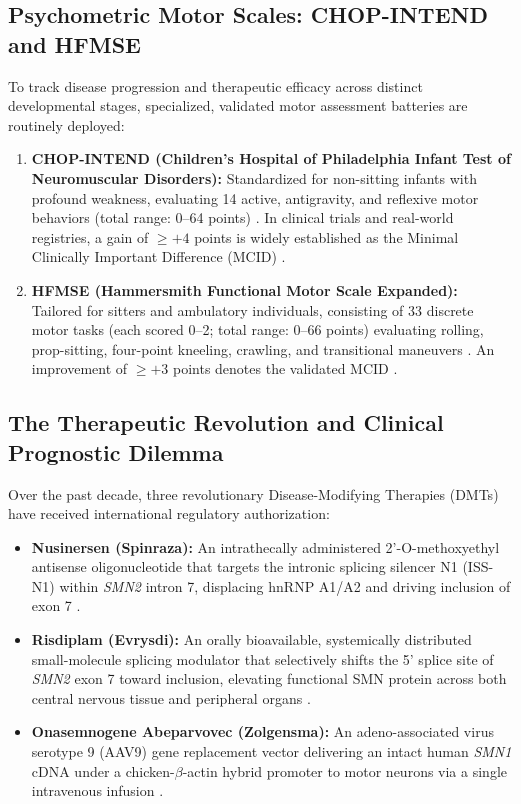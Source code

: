\documentclass[journal]{IEEEtran}
\begin{document}
\subsection{Psychometric Motor Scales: CHOP-INTEND and HFMSE}
To track disease progression and therapeutic efficacy across distinct developmental stages, specialized, validated motor assessment batteries are routinely deployed:
\begin{enumerate}
    \item \textbf{CHOP-INTEND (Children's Hospital of Philadelphia Infant Test of Neuromuscular Disorders):} Standardized for non-sitting infants with profound weakness, evaluating 14 active, antigravity, and reflexive motor behaviors (total range: 0--64 points) \cite{glanzman2010chop}. In clinical trials and real-world registries, a gain of $\ge +4$ points is widely established as the Minimal Clinically Important Difference (MCID) \cite{finkel2021endear,connolly2016clinical}.
    \item \textbf{HFMSE (Hammersmith Functional Motor Scale Expanded):} Tailored for sitters and ambulatory individuals, consisting of 33 discrete motor tasks (each scored 0--2; total range: 0--66 points) evaluating rolling, prop-sitting, four-point kneeling, crawling, and transitional maneuvers \cite{ohagen2007expanded}. An improvement of $\ge +3$ points denotes the validated MCID \cite{montes2019minimal}.
\end{enumerate}

\subsection{The Therapeutic Revolution and Clinical Prognostic Dilemma}
Over the past decade, three revolutionary Disease-Modifying Therapies (DMTs) have received international regulatory authorization:
\begin{itemize}
    \item \textbf{Nusinersen (Spinraza):} An intrathecally administered 2'-O-methoxyethyl antisense oligonucleotide that targets the intronic splicing silencer N1 (ISS-N1) within \textit{SMN2} intron 7, displacing hnRNP A1/A2 and driving inclusion of exon 7 \cite{hua2007enhancement,mercuri2018nusinersen}.
    \item \textbf{Risdiplam (Evrysdi):} An orally bioavailable, systemically distributed small-molecule splicing modulator that selectively shifts the 5' splice site of \textit{SMN2} exon 7 toward inclusion, elevating functional SMN protein across both central nervous tissue and peripheral organs \cite{ratni2018discovery,mercuri2021risdiplam,chiriboga2023sunfish}.
    \item \textbf{Onasemnogene Abeparvovec (Zolgensma):} An adeno-associated virus serotype 9 (AAV9) gene replacement vector delivering an intact human \textit{SMN1} cDNA under a chicken-$\beta$-actin hybrid promoter to motor neurons via a single intravenous infusion \cite{mendell2017single,strauss2022onasemnogene,servais2022onasemnogene}.
\end{itemize}
\end{document}
